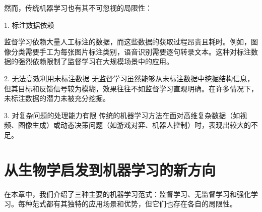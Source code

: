 然而，传统机器学习也有其不可忽视的局限性：

1. 标注数据依赖

监督学习依赖大量人工标注的数据，而这些数据的获取过程昂贵且耗时。例如，图像分类需要手工为每张图片标注类别，语音识别需要逐句转录文本。这种对标注数据的强烈依赖限制了监督学习在大规模场景中的应用。

2. 无法高效利用未标注数据
无监督学习虽然能够从未标注数据中挖掘结构信息，但其目标和反馈信号较为模糊，效果往往不如监督学习直观明确。在许多情况下，未标注数据的潜力未被充分挖掘。

3. 对复杂问题的处理能力有限
传统的机器学习方法在面对高维复杂数据（如视频、图像生成）或动态决策问题（如游戏对弈、机器人控制）时，表现出较大的不足。

\section{从生物学启发到机器学习的新方向}
在本章中，我们介绍了三种主要的机器学习范式：监督学习、无监督学习和强化学习。每种范式都有其独特的应用场景和优势，但它们也存在各自的局限性。

